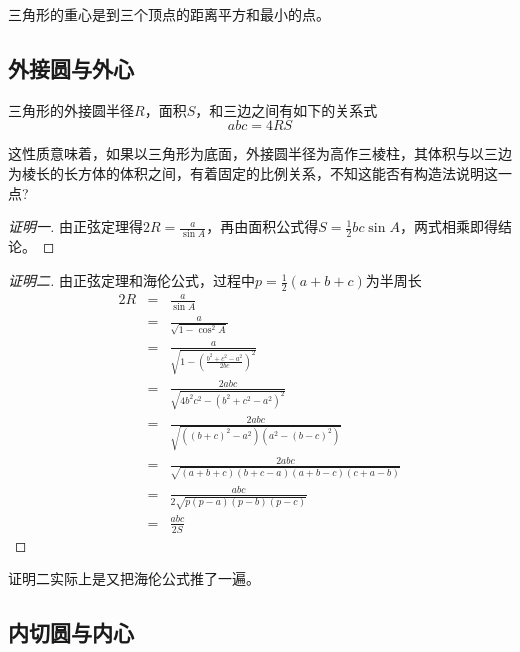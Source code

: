 \begin{inference}
  三角形的重心是到三个顶点的距离平方和最小的点。
\end{inference}

\subsection{外接圆与外心}
\label{sec:triangle-excenter}

\begin{property}
  \label{ppty:triangle-circumradius-area-sides}
  三角形的外接圆半径$R$，面积$S$，和三边之间有如下的关系式
  \begin{equation}
    \label{eq:triangle-circumradius-area-sides}
    abc = 4RS
  \end{equation}
\end{property}

这性质意味着，如果以三角形为底面，外接圆半径为高作三棱柱，其体积与以三边为棱长的长方体的体积之间，有着固定的比例关系，不知这能否有构造法说明这一点?

\begin{proof}[证明一]
  由正弦定理得$2R=\frac{a}{\sin{A}}$，再由面积公式得$S=\frac{1}{2}bc\sin{A}$，两式相乘即得结论。
\end{proof}

\begin{proof}[证明二]
  由正弦定理和海伦公式，过程中$p=\frac{1}{2}(a+b+c)$为半周长
  \begin{eqnarray*}
    2R & = & \frac{a}{\sin{A}} \\
    & = & \frac{a}{\sqrt{1-\cos^2{A}}} \\
    & = & \frac{a}{\sqrt{1-\left( \frac{b^2+c^2-a^2}{2bc} \right)^2}} \\
    & = & \frac{2abc}{\sqrt{4b^2c^2-(b^2+c^2-a^2)^2}} \\
    & = & \frac{2abc}{\sqrt{((b+c)^2-a^2)(a^2-(b-c)^2)}} \\
    & = & \frac{2abc}{\sqrt{(a+b+c)(b+c-a)(a+b-c)(c+a-b)}} \\
    & = & \frac{abc}{2 \sqrt{p(p-a)(p-b)(p-c)}} \\
    & = & \frac{abc}{2S}
  \end{eqnarray*}
\end{proof}
证明二实际上是又把海伦公式推了一遍。


\subsection{内切圆与内心}
\label{sec:triangle-incenter}

